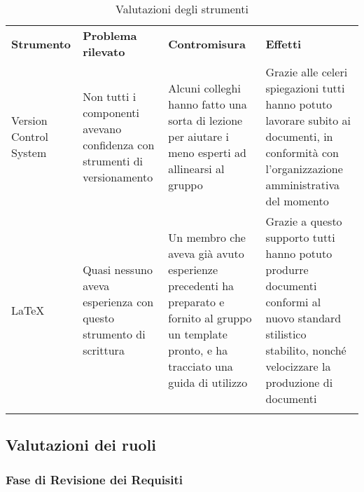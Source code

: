 \documentclass[../piano_di_qualifica.tex]{subfiles}
\begin{document}
\begin{center}
	\begin{longtable}{|p{2.5cm}|p{4.5cm}|p{4.5cm}|p{4.5cm}|}
		\hline
		\rowcolor{lightgray}
		\textbf{Strumento} & \textbf{Problema rilevato} & \textbf{Contromisura} & \textbf{Effetti} \\
		Version Control System & Non tutti i componenti avevano confidenza con strumenti di versionamento & Alcuni colleghi hanno fatto una sorta di lezione per aiutare i meno esperti ad allinearsi al gruppo & Grazie alle celeri spiegazioni tutti hanno potuto lavorare subito ai documenti, in conformità con l'organizzazione amministrativa del momento \\
		\LaTeX & Quasi nessuno aveva esperienza con questo strumento di scrittura & Un membro che aveva già avuto esperienze precedenti ha preparato e fornito al gruppo un template pronto, e ha tracciato una guida di utilizzo & Grazie a questo supporto tutti hanno potuto produrre documenti conformi al nuovo standard stilistico stabilito, nonché velocizzare la produzione di documenti\\
		\hline
		\rowcolor{white}
		\caption{Valutazioni degli strumenti}
	\end{longtable}
\end{center}


\subsection{Valutazioni dei ruoli}
\label{sub:valut_ruoli}

\subsubsection{Fase di Revisione dei Requisiti}
\end{document}
